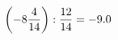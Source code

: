 \documentclass[preview]{standalone}
\begin{document}
\begin{align*}
\left( -8 { 4 \over 14 } \right)  :  { 12 \over 14 } = -9.0
\end{align*}
\end{document}
